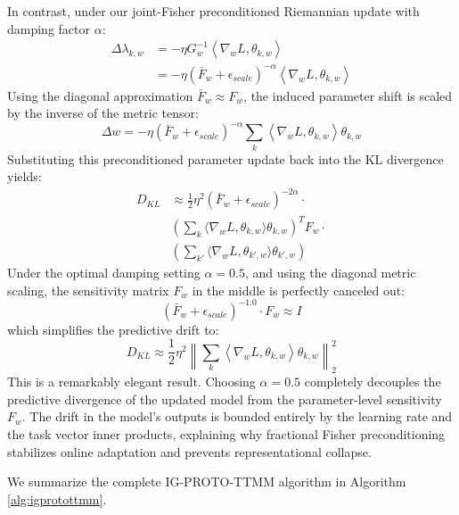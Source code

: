 \documentclass{article}
\theoremstyle{plain}
\theoremstyle{definition}
\theoremstyle{remark}
\begin{document}
In contrast, under our joint-Fisher preconditioned Riemannian update with damping factor $\alpha$:
\begin{align}
  \Delta \lambda_{k,w} &= -\eta G_w^{-1} \left\langle \nabla_{w} L, \theta_{k,w} \right\rangle \nonumber \\
  &= -\eta (\bar{F}_w + \epsilon_{scale})^{-\alpha} \left\langle \nabla_{w} L, \theta_{k,w} \right\rangle
\end{align}
Using the diagonal approximation $\bar{F}_w \approx F_w$, the induced parameter shift is scaled by the inverse of the metric tensor:
\begin{equation}
  \Delta w = -\eta (\bar{F}_w + \epsilon_{scale})^{-\alpha} \sum_k \left\langle \nabla_w L, \theta_{k,w} \right\rangle \theta_{k,w}
\end{equation}
Substituting this preconditioned parameter update back into the KL divergence yields:
\begin{align}
  D_{KL} &\approx \frac{1}{2} \eta^2 (\bar{F}_w + \epsilon_{scale})^{-2\alpha} \cdot \nonumber \\
  &\left( \sum_k \langle \nabla_w L, \theta_{k,w} \rangle \theta_{k,w} \right)^T F_w \cdot \nonumber \\
  &\left( \sum_{k'} \langle \nabla_w L, \theta_{k',w} \rangle \theta_{k',w} \right)
\end{align}
Under the optimal damping setting $\alpha = 0.5$, and using the diagonal metric scaling, the sensitivity matrix $F_w$ in the middle is perfectly canceled out:
\begin{equation}
  (\bar{F}_w + \epsilon_{scale})^{-1.0} \cdot F_w \approx I
\end{equation}
which simplifies the predictive drift to:
\begin{equation}
  D_{KL} \approx \frac{1}{2} \eta^2 \left\| \sum_k \left\langle \nabla_w L, \theta_{k,w} \right\rangle \theta_{k,w} \right\|_2^2
\end{equation}
This is a remarkably elegant result. Choosing $\alpha = 0.5$ completely decouples the predictive divergence of the updated model from the parameter-level sensitivity $F_w$. The drift in the model's outputs is bounded entirely by the learning rate and the task vector inner products, explaining why fractional Fisher preconditioning stabilizes online adaptation and prevents representational collapse.

We summarize the complete IG-PROTO-TTMM algorithm in Algorithm \ref{alg:igprotottmm}.
\end{document}
